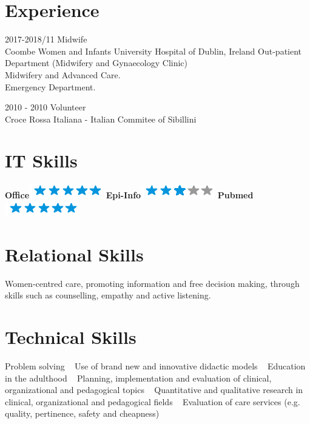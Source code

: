\documentclass[11pt]{friggeri-cv}
\begin{document}
\section{Experience}
\begin{entrylist}
  \entry
    {2017-2018/11}
    {Midwife}
    {\\Coombe Women and Infants University Hospital of Dublin, Ireland}
    {Out-patient Department (Midwifery and Gynaecology Clinic)\\
     Midwifery and Advanced Care.\\
     Emergency Department.}
    
  \entry
    {2010 - 2010}
    {Volunteer}
    {\\Croce Rossa Italiana - Italian Commitee of Sibillini}
    {\\}
\end{entrylist}
\newpage

\begin{aside}
  \section{IT Skills}
  \textbf{Office}\includegraphics[scale=0.40]{img/5stars.png}
  \textbf{Epi-Info}\includegraphics[scale=0.40]{img/3stars.png}
  \textbf{Pubmed}\includegraphics[scale=0.40]{img/5stars.png}
  ~
  \section{Relational Skills}\footnotesize{
  Women-centred care, promoting information and free decision making, through 
  skills such as counselling, empathy and active listening}.
  ~
  \section{Technical Skills}\footnotesize{
  Problem solving
  ~
  Use of brand new and innovative didactic models
  ~
  Education in the adulthood
  ~
  Planning, implementation and evaluation of clinical, organizational and 
  pedagogical topics
  ~
  Quantitative and qualitative research in clinical, organizational and 
  pedagogical fields
  ~
  Evaluation of care services (e.g. quality, pertinence, safety and cheapness)}
\end{aside}
\end{document}

